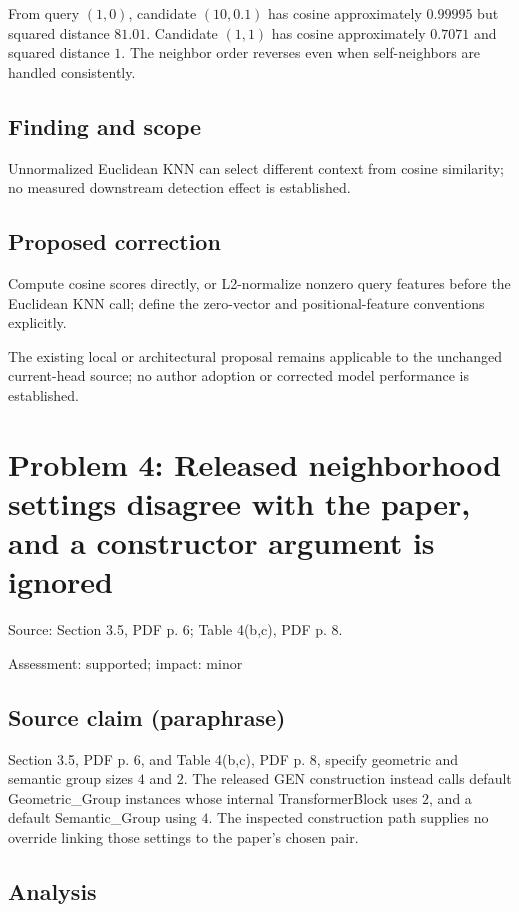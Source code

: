 \documentclass[11pt]{article}
\begin{document}
From query \((1,0)\), candidate \((10,0.1)\) has cosine approximately \(0.99995\) but squared distance \(81.01\). Candidate \((1,1)\) has cosine approximately \(0.7071\) and squared distance \(1\). The neighbor order reverses even when self-neighbors are handled consistently.

\subsection*{Finding and scope}

Unnormalized Euclidean KNN can select different context from cosine similarity; no measured downstream detection effect is established.

\subsection*{Proposed correction}

Compute cosine scores directly, or L2-normalize nonzero query features before the Euclidean KNN call; define the zero-vector and positional-feature conventions explicitly.

The existing local or architectural proposal remains applicable to the unchanged current-head source; no author adoption or corrected model performance is established.

\section*{Problem 4: Released neighborhood settings disagree with the paper, and a constructor argument is ignored}

Source: Section 3.5, PDF p. 6; Table 4(b,c), PDF p. 8.

Assessment: supported; impact: minor

\subsection*{Source claim (paraphrase)}

Section 3.5, PDF p. 6, and Table 4(b,c), PDF p. 8, specify geometric and semantic group sizes \(4\) and \(2\). The released GEN construction instead calls default Geometric\_Group instances whose internal TransformerBlock uses \(2\), and a default Semantic\_Group using \(4\). The inspected construction path supplies no override linking those settings to the paper's chosen pair.

\subsection*{Analysis}
\end{document}
